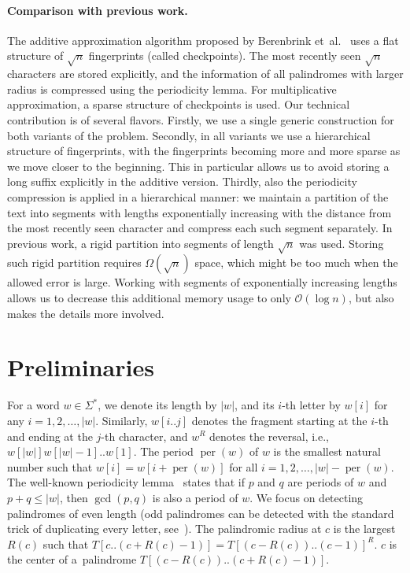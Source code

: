 \documentclass{article}[11pt,letter]
\newcommand{\bigo}{\mathcal{O}}
\newcommand{\ie}{i.e.\xspace}
\newcommand{\etal}{et~al.}
\DeclareMathOperator{\per}{per}
\begin{document}
\paragraph{Comparison with previous work.}
The additive approximation algorithm proposed by Berenbrink \etal~\cite{Berenbrink} uses a flat structure of $\sqrt{n}$ fingerprints (called checkpoints).  The most recently seen $\sqrt{n}$ characters are stored explicitly,
and the information of all palindromes with larger radius is compressed using the periodicity lemma.
For multiplicative approximation, a sparse structure of checkpoints is used.
Our technical contribution is of several flavors. Firstly, we use a single generic construction 
for both variants of the problem. Secondly, in all variants we use a hierarchical structure of fingerprints,
with the fingerprints becoming more and more sparse as we move closer to the beginning.
This in particular allows us to avoid storing a long suffix explicitly in the
additive version. Thirdly, also the periodicity compression is applied in a hierarchical manner:
we maintain a partition of the text into segments with lengths exponentially increasing
with the distance from the most recently seen character and compress each such segment
separately. In previous work, a rigid partition into segments of length $\sqrt{n}$ was used.
Storing such rigid partition requires $\Omega(\sqrt{n})$ space, which might be too much
when the allowed error is large. Working with segments of exponentially increasing lengths
allows us to decrease this additional memory usage to only $\bigo(\log n)$, but
also makes the details more involved.




\section{Preliminaries}
\label{section:preliminaries}

For a word $w\in\Sigma^{*}$, we denote its length by $|w|$, and its $i$-th letter by $w[i]$ for any $i=1,2,\ldots,|w|$. Similarly, $w[i..j]$ denotes the fragment starting at the $i$-th
and ending at the $j$-th character, and $w^{R}$ denotes the reversal, \ie, $w[|w|]w[|w|-1]..w[1]$. The period $\per(w)$ of $w$ is the smallest natural number such that
$w[i]=w[i+\per(w)]$ for all $i=1,2,\ldots,|w|-\per(w)$.
The well-known periodicity lemma~\cite{FineWilf} states that if $p$ and $q$ are periods of $w$ and $p+q\leq |w|$, then $\gcd(p,q)$ is also a period
of $w$.
We focus on detecting palindromes of even length (odd palindromes can be detected with the standard trick of duplicating every letter, see~\cite{Apostolico}).
The palindromic radius at $c$ is the largest $R(c)$ such that $T[c..(c+R(c)-1)] = T[(c-R(c))..(c-1)]^R$. $c$ is the center of
a~palindrome $T[(c-R(c))..(c+R(c)-1)]$.
\end{document}
